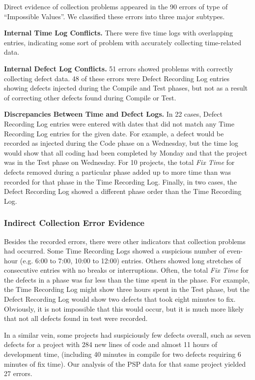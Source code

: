 Direct evidence of collection problems appeared in the 90 errors of
type of ``Impossible Values''.  We classified these errors into
three major subtypes.
      
{\bf Internal Time Log Conflicts.} There were five time logs with
overlapping entries, indicating some sort of problem with accurately
collecting time-related data.

{\bf Internal Defect Log Conflicts.} 51 errors showed problems with
correctly collecting defect data.  48 of these errors were Defect Recording
Log entries showing defects injected during the Compile and Test phases,
but not as a result of correcting other defects found during Compile or
Test.
      
{\bf Discrepancies Between Time and Defect Logs.} In 22 cases, Defect
Recording Log entries were entered with dates that did not match any Time
Recording Log entries for the given date.  For example, a defect would be
recorded as injected during the Code phase on a Wednesday, but the time log
would show that all coding had been completed by Monday and that the
project was in the Test phase on Wednesday.  For 10 projects, the total
{\it Fix Time} for defects removed during a particular phase added up to
more time than was recorded for that phase in the Time Recording Log.
Finally, in two cases, the Defect Recording Log showed a different phase
order than the Time Recording Log.


\subsubsection{Indirect Collection Error Evidence}

Besides the recorded errors, there were other indicators that collection
problems had occurred. Some Time Recording Logs showed a suspicious number
of even-hour (e.g. 6:00 to 7:00, 10:00 to 12:00) entries.  Others showed
long stretches of consecutive entries with no breaks or interruptions.
Often, the total {\it Fix Time} for the defects in a phase was far less
than the time spent in the phase. For example, the Time Recording Log might
show three hours spent in the Test phase, but the Defect Recording Log
would show two defects that took eight minutes to fix.  Obviously, it is
not impossible that this would occur, but it is much more likely that not
all defects found in test were recorded.  

In a similar vein, some projects had suspiciously few defects overall, such
as seven defects for a project with 284 new lines of code and almost 11 hours 
of development time, (including 40 minutes in compile for two defects requiring 
6 minutes of fix time). Our analysis of the PSP data for that same project 
yielded 27 errors.

